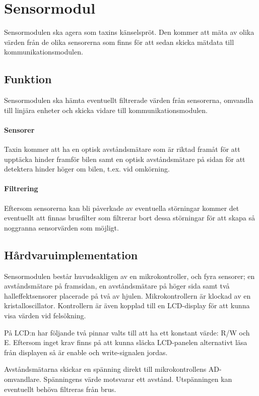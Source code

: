 \documentclass[designspec/spec.tex]{subfiles}
\begin{document}
\section{Sensormodul}
Sensormodulen ska agera som taxins känselspröt. Den kommer att mäta av olika
värden från de olika sensorerna som finns för att sedan skicka mätdata till
kommunikationsmodulen.

\subsection{Funktion}
Sensormodulen ska hämta eventuellt filtrerade värden från sensorerna, omvandla
till linjära enheter och skicka vidare till kommunikationsmodulen.

\paragraph{Sensorer}
Taxin kommer att ha en optisk avståndsmätare som är riktad framåt för att
upptäcka hinder framför bilen samt en optisk avståndsmätare på sidan för att
detektera hinder höger om bilen, t.ex. vid omkörning.

\paragraph{Filtrering} Eftersom sensorerna kan bli påverkade av eventuella
störningar kommer det eventuellt att finnas brusfilter som filtrerar bort dessa
störningar för att skapa så noggranna sensorvärden som möjligt.

\subsection{Hårdvaruimplementation}
Sensormodulen består huvudsakligen av en mikrokontroller, och fyra sensorer; en
avståndsmätare på framsidan, en avståndsmätare på höger sida samt två
halleffektsensorer placerade på två av hjulen. Mikrokontrollern är klockad av 
en kristalloscillator. Kontrollern är även kopplad till en LCD-display
för att kunna visa värden vid felsökning.

På LCD:n har följande två pinnar valts till att ha ett konstant värde: R/W och
E. Eftersom inget krav finns på att kunna släcka LCD-panelen alternativt läsa från
displayen så är enable och write-signalen jordas.

Avståndsmätarna skickar en spänning direkt till mikrokontrollens AD-omvandlare.
Spänningens värde motsvarar ett avstånd. Utspänningen kan eventuellt behöva
filtreras från brus.
\end{document}
